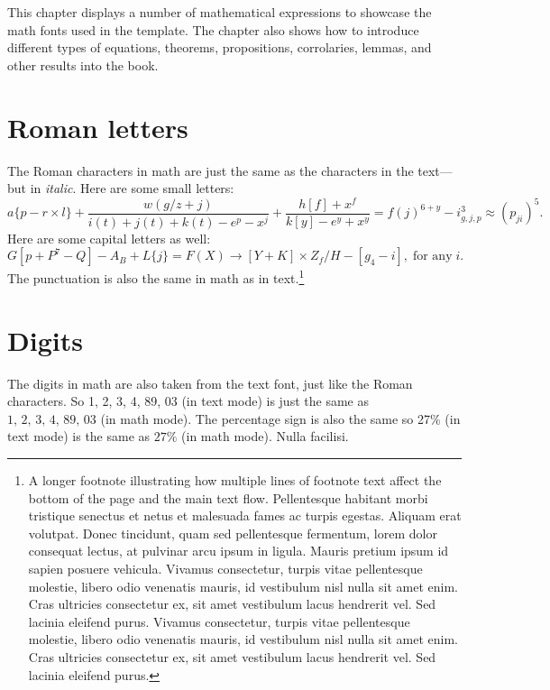 This chapter displays a number of mathematical expressions to showcase the math fonts used in the template. The chapter also shows how to introduce different types of equations, theorems, propositions, corrolaries, lemmas, and other results into the book.

\section{Roman letters}\label{s:math} 

The Roman characters in math are just the same as the characters in the text---but in \textit{italic}. Here are some small letters: 
\begin{equation*}
a\{p - r \times l\} + \frac{w(g/z+j)}{i(t)+j(t)+k(t) - e^p - x^j} + \frac{h[f]+x^f}{k[y]-e^y + x^y} = f(j)^{6+y} - i^3_{g,j,p} \approx (p_{ji})^5.
\end{equation*}
Here are some capital letters as well: 
\begin{equation*}
G[p + P^7-Q] - A_B + L\{j\} = F(X) \to [Y+K]\times Z_f/H - [g_4 - i],\;\text{for any}\;i.
\end{equation*}
The punctuation is also the same in math as in text.\footnote{A longer footnote illustrating how multiple lines of footnote text affect the bottom of the page and the main text flow. Pellentesque habitant morbi tristique senectus et netus et malesuada fames ac turpis egestas. Aliquam erat volutpat. Donec tincidunt, quam sed pellentesque fermentum, lorem dolor consequat lectus, at pulvinar arcu ipsum in ligula. Mauris pretium ipsum id sapien posuere vehicula. Vivamus consectetur, turpis vitae pellentesque molestie, libero odio venenatis mauris, id vestibulum nisl nulla sit amet enim. Cras ultricies consectetur ex, sit amet vestibulum lacus hendrerit vel. Sed lacinia eleifend purus. Vivamus consectetur, turpis vitae pellentesque molestie, libero odio venenatis mauris, id vestibulum nisl nulla sit amet enim. Cras ultricies consectetur ex, sit amet vestibulum lacus hendrerit vel. Sed lacinia eleifend purus.} 

\section{Digits} 

The digits in math are also taken from the text font, just like the Roman characters. So 1, 2, 3, 4, 89, 03 (in text mode) is just the same as $1,\,2,\,3,\,4,\,89,\,03$ (in math mode). The percentage sign is also the same so 27\% (in text mode) is the same as $27\%$ (in math mode). Nulla facilisi.

